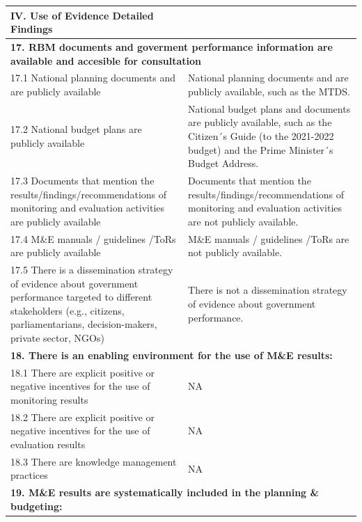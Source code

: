 \documentclass[
  10pt,
]{book}
\begin{document}
\begin{table}
\centering
\begin{tabular}[t]{l|l}
\hline
IV. Use of Evidence Detailed Findings &  \\
\hline
\multicolumn{2}{l}{\textbf{17. RBM documents and goverment performance information are available and accesible for consultation}}\\
\hline
\hspace{1em}17.1 National planning documents and are publicly available & National planning documents and are publicly available, such as the MTDS.\\
\hline
\hspace{1em}17.2 National budget plans are publicly available & National budget plans and documents are publicly available, such as the Citizen´s Guide (to the 2021-2022 budget) and the Prime Minister´s Budget Address.\\
\hline
\hspace{1em}17.3 Documents that mention the results/findings/recommendations of monitoring and evaluation activities are publicly available & Documents that mention the results/findings/recommendations of monitoring and evaluation activities are not publicly available.\\
\hline
\hspace{1em}17.4 M\&E manuals / guidelines /ToRs are publicly available & M\&E manuals / guidelines /ToRs are not publicly available.\\
\hline
\hspace{1em}17.5 There is a dissemination strategy of evidence about government performance targeted to different stakeholders (e.g., citizens, parliamentarians, decision-makers, private sector, NGOs) & There is not a dissemination strategy of evidence about government performance.\\
\hline
\multicolumn{2}{l}{\textbf{18. There is an enabling environment for the use of M\&E results:}}\\
\hline
\hspace{1em}18.1 There are explicit positive or negative incentives for the use of monitoring results & NA\\
\hline
\hspace{1em}18.2 There are explicit positive or negative incentives for the use of evaluation results & NA\\
\hline
\hspace{1em}18.3 There are knowledge management practices & NA\\
\hline
\multicolumn{2}{l}{\textbf{19. M\&E results are systematically included in the planning \& budgeting:}}\\

\end{tabular}
\end{table}
\end{document}
